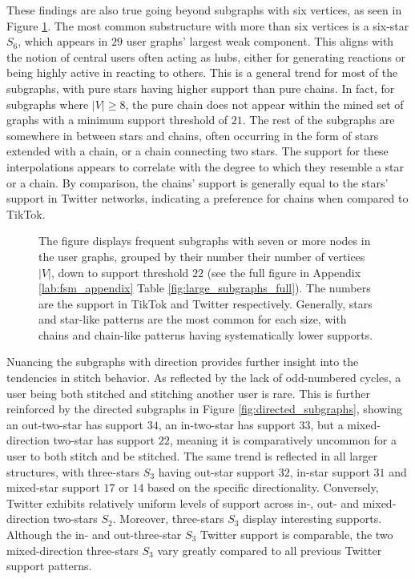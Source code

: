 These findings are also true going beyond subgraphs with six vertices, as seen in Figure \ref{fig:large_subgraphs}. The most common substructure with more than six vertices is a six-star $S_6$, which appears in $29$ user graphs' largest weak component. This aligns with the notion of central users often acting as hubs, either for generating reactions or being highly active in reacting to others. This is a general trend for most of the subgraphs, with pure stars having higher support than pure chains. In fact, for subgraphs where $|V| \geq 8$, the pure chain does not appear within the mined set of graphs with a minimum support threshold of $21$. The rest of the subgraphs are somewhere in between stars and chains, often occurring in the form of stars extended with a chain, or a chain connecting two stars. The support for these interpolations appears to correlate with the degree to which they resemble a star or a chain. By comparison, the chains' support is generally equal to the stars' support in Twitter networks, indicating a preference for chains when compared to TikTok.

\begin{figure}[!htbp]
    \centering
    \begin{adjustwidth}{-\textwidth}{-\textwidth}
        \centering    
        
    \end{adjustwidth}
    \caption{The figure displays frequent subgraphs with seven or more nodes in the user graphs, grouped by their number their number of vertices $|V|$, down to support threshold $22$ (see the full figure in Appendix \ref{lab:fsm_appendix} Table \ref{fig:large_subgraphs_full}). The numbers are the support in TikTok and Twitter respectively. Generally, stars and star-like patterns are the most common for each size, with chains and chain-like patterns having systematically lower supports.}
    \label{fig:large_subgraphs}
\end{figure}

Nuancing the subgraphs with direction provides further insight into the tendencies in stitch behavior. As reflected by the lack of odd-numbered cycles, a user being both stitched and stitching another user is rare. This is further reinforced by the directed subgraphs in Figure \ref{fig:directed_subgraphs}, showing an out-two-star has support $34$, an in-two-star has support $33$, but a mixed-direction two-star has support $22$, meaning it is comparatively uncommon for a user to both stitch and be stitched. The same trend is reflected in all larger structures, with three-stars $S_3$ having out-star support $32$, in-star support $31$ and mixed-star support $17$ or $14$ based on the specific directionality. Conversely, Twitter exhibits relatively uniform levels of support across in-, out- and mixed-direction two-stars $S_2$. Moreover, three-stars $S_3$ display interesting supports. Although the in- and out-three-star $S_3$ Twitter support is comparable, the two mixed-direction three-stars $S_3$ vary greatly compared to all previous Twitter support patterns. 

